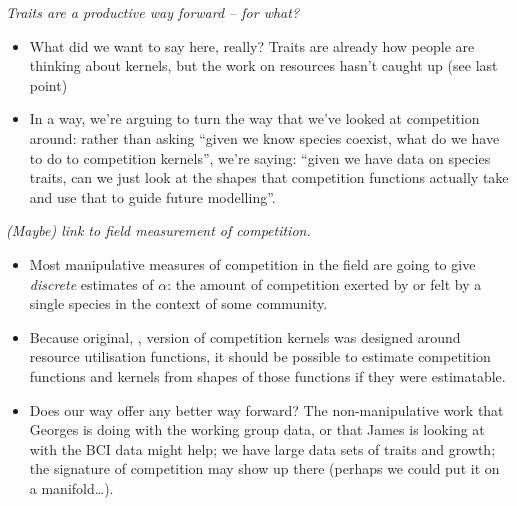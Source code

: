\documentclass[a4paper,11pt]{article}
\begin{document}
\textit{Traits are a productive way forward -- for what?}
\begin{itemize}
\item What did we want to say here, really?  Traits are already how
  people are thinking about kernels, but the work on resources hasn't
  caught up (see last point)
\item In a way, we're arguing to turn the way that we've looked at
  competition around: rather than asking ``given we know species
  coexist, what do we have to do to competition kernels'', we're
  saying: ``given we have data on species traits, can we just look at
  the shapes that competition functions actually take and use that to
  guide future modelling''.
\end{itemize}

\textit{(Maybe) link to field measurement of competition.}
\begin{itemize}
\item Most manipulative measures of competition in the field are going
  to give \emph{discrete} estimates of $\alpha$: the amount of
  competition exerted by or felt by a single species in the context of
  some community.
\item Because original, \citet{MacArthur-1967}, version of competition
  kernels was designed around resource utilisation functions, it
  should be possible to estimate competition functions and kernels
  from shapes of those functions if they were estimatable.
\item Does our way offer any better way forward?  The non-manipulative
  work that Georges is doing with the working group data, or that
  James is looking at with the BCI data might help; we have large data
  sets of traits and growth; the signature of competition may show up
  there (perhaps we could put it on a manifold\ldots).
\end{itemize}
\end{document}
